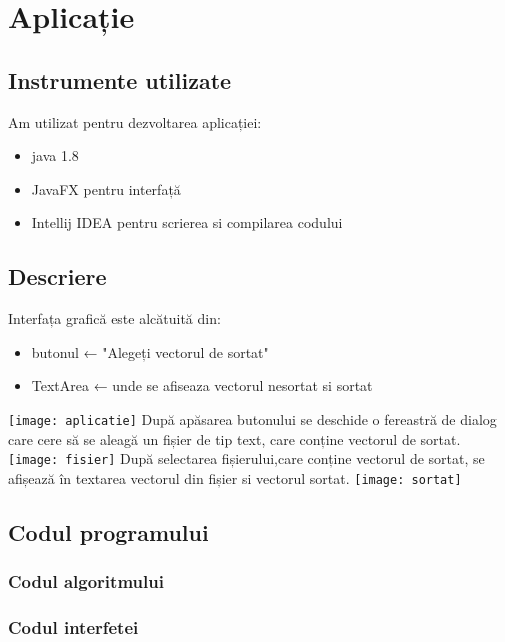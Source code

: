 \chapter{Aplicație}
\section{Instrumente utilizate}
\Large{Am utilizat pentru dezvoltarea aplicației:}
\begin{itemize}
    \item {java 1.8}
    \item {JavaFX pentru interfață}
    \item {Intellij IDEA pentru scrierea si compilarea codului}
\end{itemize}
\section{Descriere}
Interfața grafică este alcătuită din:
\begin{itemize}
    \item butonul ← "Alegeți vectorul de sortat"
    \item TextArea ← unde se afiseaza vectorul nesortat si sortat
\end{itemize}
\newpage
\texttt{[image: aplicatie]}\newline
După apăsarea butonului se deschide o fereastră de dialog care cere să se aleagă un fișier de tip text, care conține vectorul de sortat.\newline
\texttt{[image: fisier]}\newline
După selectarea fișierului,care conține vectorul de sortat, se afișează în textarea vectorul din fișier si vectorul sortat.\newline
\texttt{[image: sortat]}
\section{Codul programului}
\subsection{Codul algoritmului}

\subsection{Codul interfetei}


